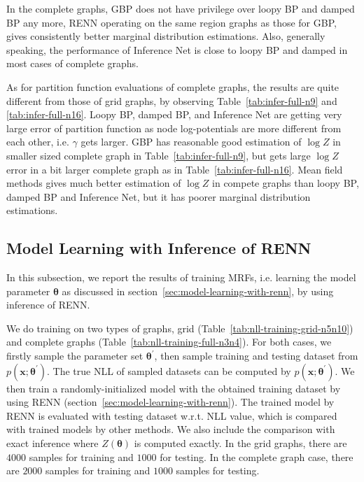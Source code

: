 In the complete graphs, GBP does not have privilege over loopy BP and damped BP any more, RENN operating on the same region graphs as those for GBP, gives consistently better marginal distribution estimations. Also, generally speaking, the performance of Inference Net is close to loopy BP and damped in most cases of complete graphs.

As for partition function evaluations of complete graphs, the results are quite different from those of grid graphs, by observing Table~\ref{tab:infer-full-n9} and \ref{tab:infer-full-n16}. Loopy BP, damped BP, and Inference Net are getting very large error of partition function as node log-potentials are more different from each other, i.e. $\gamma$ gets larger. GBP has reasonable good estimation of $\log{Z}$ in smaller sized complete graph in Table~\ref{tab:infer-full-n9}, but gets large $\log{Z}$ error in a bit larger complete graph as in Table~\ref{tab:infer-full-n16}. Mean field methods gives much better estimation of $\log{Z}$ in compete graphs than loopy BP, damped BP and Inference Net, but it has poorer marginal distribution estimations.

\subsection{Model Learning with Inference of RENN}

In this subsection, we report the results of training MRFs, i.e. learning the model parameter $\bm{\theta}$ as discussed in section~\ref{sec:model-learning-with-renn}, by using inference of RENN.



We do training on two types of graphs, grid (Table~\ref{tab:nll-training-grid-n5n10}) and complete graphs (Table~\ref{tab:nll-training-full-n3n4}). For both cases, we firstly sample the parameter set $\bm{\theta}^{\prime}$, then sample training and testing dataset from $p(\bm{x}; \bm{\theta}^{\prime})$. The true NLL of sampled datasets can be computed by $p(\bm{x}; \bm{\theta}^{\prime})$. We then train a randomly-initialized model with the obtained training dataset by using RENN (section~\ref{sec:model-learning-with-renn}). The trained model by RENN is evaluated with testing dataset w.r.t. NLL value, which is compared with trained models by other methods. We also include the comparison with exact inference where $Z(\bm{\theta})$ is computed exactly.
In the grid graphs, there are $4000$ samples for training and $1000$ for testing. In the complete graph case, there are $2000$ samples for training and $1000$ samples for testing. 

